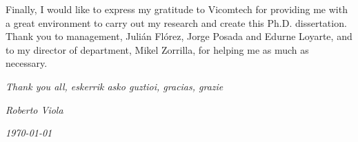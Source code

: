 \begin{acknowledgements}
Finally, I would like to express my gratitude to Vicomtech for providing me with a great environment to carry out my research and create this Ph.D. dissertation. Thank you to management, Juli\'an Fl\'orez, Jorge Posada and Edurne Loyarte, and to my director of department, Mikel Zorrilla, for helping me as much as necessary.

\begin{flushright}
\textit{Thank you all, eskerrik asko guztioi, gracias, grazie}

\textit{Roberto Viola}

\textit{\today}







\end{flushright}



\end{acknowledgements}



